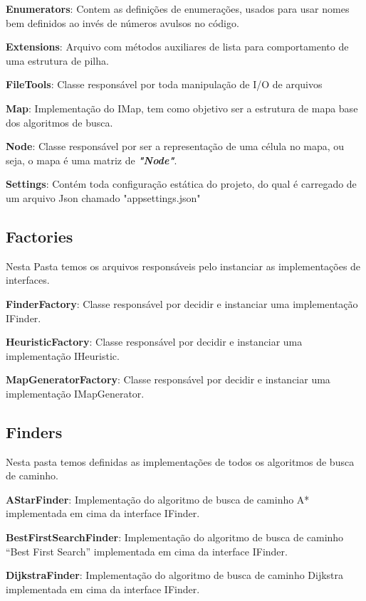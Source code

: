  \textbf{Enumerators}: Contem as definições de enumerações, usados para usar nomes bem definidos ao invés de números avulsos no código.
 
 \textbf{Extensions}: Arquivo com métodos auxiliares de lista para comportamento de uma estrutura de pilha.
 
 \textbf{FileTools}: Classe responsável por toda manipulação de I/O de arquivos
 
 \textbf{Map}: Implementação do IMap, tem como objetivo ser a estrutura de mapa base dos algoritmos de busca.
 
 \textbf{Node}: Classe responsável por ser a representação de uma célula no mapa, ou seja, o mapa é uma matriz de \textbf{\textit{"Node"}}.
 
 \textbf{Settings}: Contém toda configuração estática do projeto, do qual é carregado de um arquivo Json chamado "appsettings.json"
 
 \subsection{Factories}
 
 Nesta Pasta temos os arquivos responsáveis pelo instanciar as implementações de interfaces.
 
 \textbf{FinderFactory}: Classe responsável por decidir e instanciar uma implementação IFinder.
 
 \textbf{HeuristicFactory}: Classe responsável por decidir e instanciar uma implementação IHeuristic.
 
 \textbf{MapGeneratorFactory}: Classe responsável por decidir e instanciar uma implementação IMapGenerator.
 
 \subsection{Finders}
 
 Nesta pasta temos definidas as implementações de todos os algoritmos de busca de caminho.
 
 \textbf{AStarFinder}: Implementação do algoritmo de busca de caminho A* implementada em cima da interface IFinder.
 
 \textbf{BestFirstSearchFinder}: Implementação do algoritmo de busca de caminho “Best First Search” implementada em cima da interface IFinder.
 
 \textbf{DijkstraFinder}: Implementação do algoritmo de busca de caminho Dijkstra implementada em cima da interface IFinder.
 
